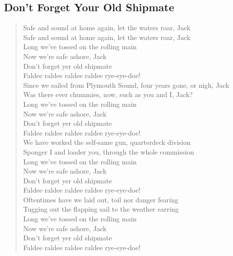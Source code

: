 \documentclass[11pt]{article}
\begin{document}
\subsection{Don't Forget Your Old Shipmate}
\label{sec:orgf129bae}
\begin{verse}
Safe and sound at home again, let the waters roar, Jack\\
Safe and sound at home again, let the waters roar, Jack\\
\vspace*{1em}
Long we've tossed on the rolling main\\
Now we're safe ashore, Jack\\
Don't forget yer old shipmate\\
Faldee raldee raldee raldee rye-eye-doe!\\
\vspace*{1em}
Since we sailed from Plymouth Sound, four years gone, or nigh, Jack\\
Was there ever chummies, now, such as you and I, Jack?\\
Long we've tossed on the rolling main\\
Now we're safe ashore, Jack\\
Don't forget yer old shipmate\\
Faldee raldee raldee raldee rye-eye-doe!\\
\vspace*{1em}
We have worked the self-same gun, quarterdeck division\\
Sponger I and loader you, through the whole commission\\
\vspace*{1em}
Long we've tossed on the rolling main\\
Now we're safe ashore, Jack\\
Don't forget yer old shipmate\\
Faldee raldee raldee raldee rye-eye-doe!\\
\vspace*{1em}
Oftentimes have we laid out, toil nor danger fearing\\
Tugging out the flapping sail to the weather earring\\
\vspace*{1em}
Long we've tossed on the rolling main\\
Now we're safe ashore, Jack\\
Don't forget yer old shipmate\\
Faldee raldee raldee raldee rye-eye-doe!\\

\end{verse}
\end{document}
